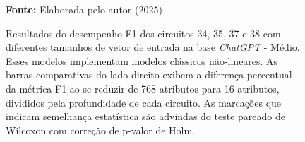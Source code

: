 \begin{figure}
\caption{Resultados do desempenho F1 dos circuitos 34, 35, 37 e 38 com diferentes tamanhos de vetor de entrada na base \textit{ChatGPT} - Médio. Esses modelos implementam modelos clássicos não-lineares. As barras comparativas do lado direito exibem a diferença percentual da métrica F1 ao se reduzir de 768 atributos para 16 atributos, divididos pela profundidade de cada circuito. As marcações que indicam semelhança estatística são advindas do teste pareado de Wilcoxon com correção de p-valor de Holm.}
\label{fig:n_features:medium:g5}
     \centering
    \centering
      \par\medskip\ABNTEXfontereduzida\selectfont\textbf{Fonte:} Elaborada pelo autor (2025) \par\medskip
\end{figure}